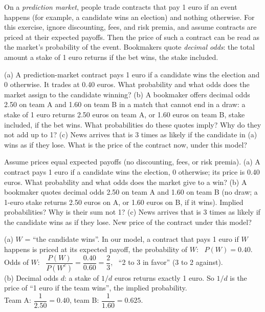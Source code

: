 
\begin{problem}
	\begin{context}
		On a \emph{prediction market}, people trade contracts that pay 1 euro if
		an event happens (for example, a candidate wins an election) and nothing
		otherwise. For this exercise, ignore discounting, fees, and risk premia,
		and assume contracts are priced at their expected payoffs. Then the price
		of such a contract can be read as the market's probability of the event.
		Bookmakers quote \emph{decimal odds}: the total
		amount a stake of 1 euro returns if the bet wins, the stake included.
	\end{context}
	(a) A prediction-market contract pays 1 euro if a candidate wins the
	election and 0 otherwise. It trades at 0.40 euros. What probability and
	what odds does the market assign to the candidate winning?
	(b) A bookmaker offers decimal odds 2.50 on team A and 1.60 on team B in a
	match that cannot end in a draw: a stake of 1 euro returns 2.50 euros on
	team A, or 1.60 euros on team B, stake included, if the bet wins. What
	probabilities
	do these quotes imply? Why do they not add up to 1?
	(c) News arrives that is 3 times as likely if the candidate in (a) wins as
	if they lose. What is the price of the contract now, under this model?
\end{problem}

\begin{slideproblem}
	Assume prices equal expected payoffs (no discounting, fees, or risk premia).
	(a) A contract pays 1 euro if a candidate wins the election, 0 otherwise;
	its price is 0.40 euros. What probability and what odds does the market
	give to a win?
	(b) A bookmaker quotes decimal odds 2.50 on team A and 1.60 on team B (no
	draw; a 1-euro stake returns 2.50 euros on A, or 1.60 euros on B, if it
	wins). Implied
	probabilities? Why is their sum not 1?
	(c) News arrives that is 3 times as likely if the candidate wins as if they
	lose. New price of the contract under this model?
\end{slideproblem}

\begin{slides}
	\small
	\exstatement
	\pause
	\sol (a) $W$ = ``the candidate wins''. In our model, a contract that pays 1
	euro if $W$ happens is priced at its expected payoff, the probability of
	$W$: \ $P(W)=0.40$.\\[1mm]
	\pause
	Odds of $W$: \
	$\dfrac{P(W)}{P(W^c)}=\dfrac{0.40}{0.60}=\dfrac23$, \ ``2 to 3 in favor''
	(3 to 2 against).\\[1mm]
	\pause
	(b) Decimal odds $d$: a stake of $1/d$ euros returns exactly 1 euro. So
	$1/d$ is the price of ``1 euro if the team wins'', the implied
	probability.\\[1mm]
	\pause
	Team A: $\dfrac{1}{2.50}=0.40$, \qquad team B: $\dfrac{1}{1.60}=0.625$.
\end{slides}

